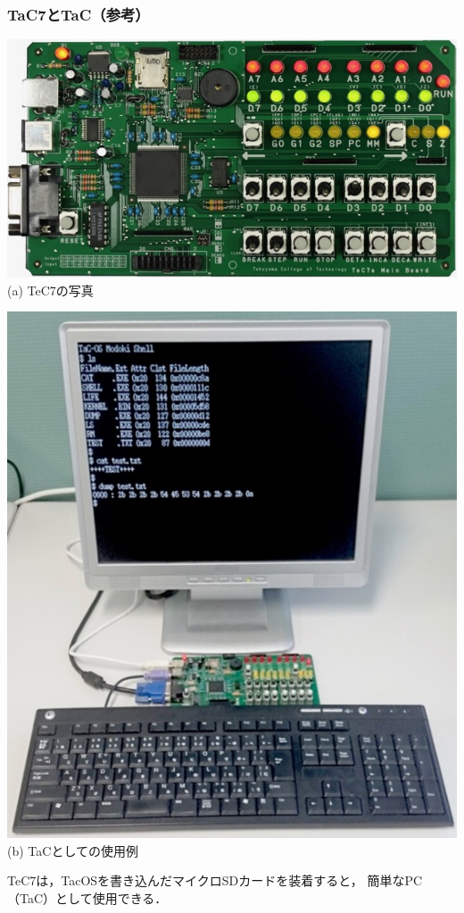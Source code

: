 \documentclass{beamer}                   %
\begin{document}
\begin{frame}
  \frametitle{TaC7とTaC（参考）}
  \begin{minipage}{0.58\columnwidth}
    \begin{center}
      \includegraphics[scale=0.27]{Photo/TeC7.jpg}\\
      (a) TeC7の写真
    \end{center}
  \end{minipage}
  \begin{minipage}{0.38\columnwidth}
    \begin{center}
      \includegraphics[scale=0.22]{Photo/TaC.jpg}\\
      (b) TaCとしての使用例
    \end{center}
  \end{minipage}
\vfill
TeC7は，TacOSを書き込んだマイクロSDカードを装着すると，
簡単なPC（TaC）として使用できる．
\end{frame}
\end{document}
